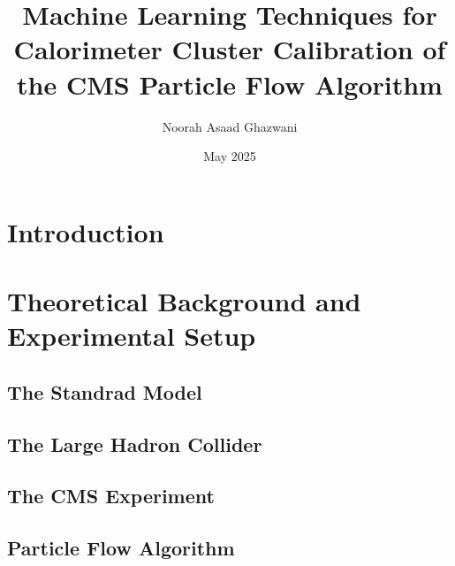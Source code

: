 \documentclass
[
]
{thesis}
\title{Machine Learning Techniques for Calorimeter Cluster Calibration of the CMS Particle Flow Algorithm}
\author{Noorah Asaad Ghazwani}
\date{May 2025}
\begin{document}

\setlength{\belowdisplayskip}{1ex} \setlength{\belowdisplayshortskip}{1ex}
\setlength{\abovedisplayskip}{1ex} \setlength{\abovedisplayshortskip}{1ex}


\chapter{Introduction}


\chapter{Theoretical Background and Experimental Setup}
\label{ch2}

%

\section{The Standrad Model}


\section{The Large Hadron Collider}


\section{The CMS Experiment}


\section{Particle Flow Algorithm}

\end{document}
